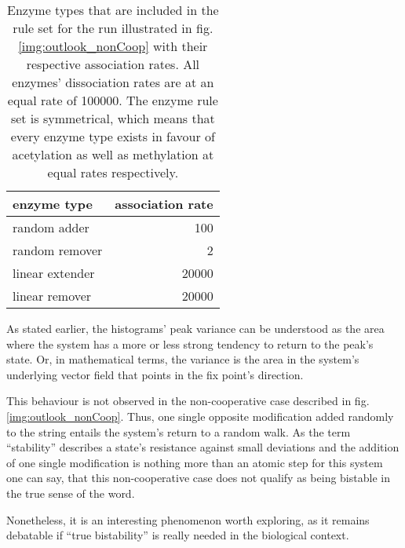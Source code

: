     \begin{table}[htbp!]
        \caption{Enzyme types that are included in the rule set for the run illustrated in fig. \ref{img:outlook_nonCoop} with their respective association rates. All enzymes' dissociation rates are at an equal rate of 100000. The enzyme rule set is symmetrical, which means that every enzyme type exists in favour of acetylation as well as methylation at equal rates respectively.}
        \begin{center}
            \begin{tabular}{l r}
                \hline
                \textbf{enzyme type} & \textbf{association rate} \\
                \hline
                random adder & 100 \\
                random remover & 2 \\
                linear extender & 20000 \\
                linear remover & 20000 \\
                \hline
            \end{tabular}
        \end{center}
        \label{img:enzymeRatesPeculiarCase}
    \end{table}

    As stated earlier, the histograms' peak variance can be understood as the area where the system has a more or less strong tendency to return to the peak's state. Or, in mathematical terms, the variance is the area in the system's underlying vector field that points in the fix point's direction.

    This behaviour is not observed in the non-cooperative case described in fig. \ref{img:outlook_nonCoop}. Thus, one single opposite modification added randomly to the string entails the system's return to a random walk. As the term “stability” describes a state's resistance against small deviations and the addition of one single modification is nothing more than an atomic step for this system %
    one can say, that this non-cooperative case does not qualify as being bistable in the true sense of the word.

    Nonetheless, it is an interesting phenomenon worth exploring, as it remains debatable if “true bistability” is really needed in the biological context.
